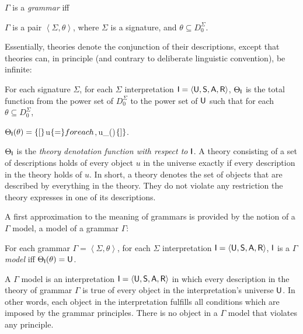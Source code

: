 \documentclass[output=paper
                ,modfonts
                ,nonflat
	        ,collection
	        ,collectionchapter
	        ,collectiontoclongg
 	        ,biblatex
                ,babelshorthands
                ,newtxmath
                ,draftmode
                ,colorlinks, citecolor=brown
]{./langsci/langscibook}
\begin{document}
{\begin{mydef}\label{def-grammar}
  $\Gamma$ is a \emph{grammar} iff
  
$\Gamma$ is a pair
\( \left<\Sigma, \theta \right>\), where
$\Sigma$ is a signature, and
$\theta \subseteq D_0^{\Sigma}$.
\end{mydef}

Essentially, theories denote the conjunction of their descriptions,
except that theories can, in principle (and contrary to deliberate linguistic
convention), be infinite:

\begin{mydef}
For each signature $\Sigma$,
for each $\Sigma$ interpretation $\mathsf{I}=\langle\mathsf{U},\mathsf{S},\mathsf{A},\mathsf{R}\rangle$,
$\Theta_{\mathsf{I}}$ is the total function from the power set of $D_0^{\Sigma}$ to the
power set of $\mathsf{U}$ such that
for each $\theta\subseteq D_0^{\Sigma}$,

$\Theta_{\Inte}(\theta)= %
\set[
$u\in \Unive$
\{{=}\} for each $\delta \in \theta$,
      $u\in\Dinte_{\Inte}(\delta)$
\{{]}\}$.
\end{mydef}

$\Theta_{\mathsf{I}}$ is the \emph{theory denotation function with respect
  to $\mathsf{I}$}. A theory consisting of a set of descriptions holds of
every object $u$ in the universe exactly if every description in the theory
holds of $u$. In short, a theory denotes the set of objects that are described
by everything in the theory. They do not violate any restriction the theory
expresses in one of its descriptions.


A first approximation to the meaning of grammars is provided by the notion
of a $\Gamma$ model, a model of a grammar $\Gamma$:

\begin{mydef}\label{def-rsrl-model}
For each grammar $\Gamma = \left< \Sigma, \theta \right>$,
for each $\Sigma$ interpretation $\mathsf{I}=\langle\mathsf{U},\mathsf{S},\mathsf{A},\mathsf{R}\rangle$,
$\mathsf{I}$
is a \emph{$\Gamma$ model} iff
\(\Theta_{\mathsf{I}}(\theta) =\mathsf{U}\).
\end{mydef}

A $\Gamma$ model is an interpretation $\mathsf{I}=\langle\mathsf{U},\mathsf{S},\mathsf{A},\mathsf{R}\rangle$ in which
every description in the theory of grammar $\Gamma$ is true of every object
in the interpretation's universe $\mathsf{U}$. In other words, each object
in the interpretation fulfills all conditions which are imposed by
the grammar principles. There is no object in a $\Gamma$ model that
violates any principle.

}
\end{document}
